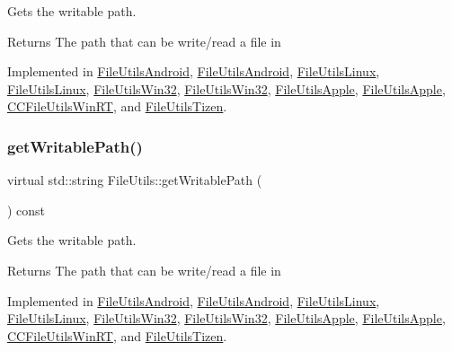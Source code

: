 Gets the writable path. \begin{DoxyReturn}{Returns}
The path that can be write/read a file in 
\end{DoxyReturn}


Implemented in \hyperlink{classFileUtilsAndroid_a98e6cf3fe3d7023fc5adb965c851be85}{File\+Utils\+Android}, \hyperlink{classFileUtilsAndroid_a51cf37a9916441127b8bb349ab037f23}{File\+Utils\+Android}, \hyperlink{classFileUtilsLinux_a8d7c6a6b1d749016cf44849f4842407b}{File\+Utils\+Linux}, \hyperlink{classFileUtilsLinux_a67c863ea1f03b866be4d8be53d4103a1}{File\+Utils\+Linux}, \hyperlink{classFileUtilsWin32_a7aabbee0edc6ccbb7930de5c23383c54}{File\+Utils\+Win32}, \hyperlink{classFileUtilsWin32_a5e9b4cf8f8caa5db5b58606bf8d099b8}{File\+Utils\+Win32}, \hyperlink{classFileUtilsApple_a595858371ceb723ab608f535f8a2c454}{File\+Utils\+Apple}, \hyperlink{classFileUtilsApple_ab88aca64f02b23087542ed28f1ad43d8}{File\+Utils\+Apple}, \hyperlink{classCCFileUtilsWinRT_a546c4b1920e4484929a0d3cffe554720}{C\+C\+File\+Utils\+Win\+RT}, and \hyperlink{classFileUtilsTizen_a5ded2b60f350ec2b245c97ec48e57ffc}{File\+Utils\+Tizen}.

\mbox{\label{classFileUtils_aab14c8d4e292f7a1e9b2b2908d02a0ed}} 
\subsubsection{\texorpdfstring{get\+Writable\+Path()}{getWritablePath()}\hspace{0.1cm}{\footnotesize\ttfamily [2/2]}}
{\footnotesize\ttfamily virtual std\+::string File\+Utils\+::get\+Writable\+Path (\begin{DoxyParamCaption}{ }\end{DoxyParamCaption}) const\hspace{0.3cm}{\ttfamily [pure virtual]}}

Gets the writable path. \begin{DoxyReturn}{Returns}
The path that can be write/read a file in 
\end{DoxyReturn}


Implemented in \hyperlink{classFileUtilsAndroid_a98e6cf3fe3d7023fc5adb965c851be85}{File\+Utils\+Android}, \hyperlink{classFileUtilsAndroid_a51cf37a9916441127b8bb349ab037f23}{File\+Utils\+Android}, \hyperlink{classFileUtilsLinux_a8d7c6a6b1d749016cf44849f4842407b}{File\+Utils\+Linux}, \hyperlink{classFileUtilsLinux_a67c863ea1f03b866be4d8be53d4103a1}{File\+Utils\+Linux}, \hyperlink{classFileUtilsWin32_a7aabbee0edc6ccbb7930de5c23383c54}{File\+Utils\+Win32}, \hyperlink{classFileUtilsWin32_a5e9b4cf8f8caa5db5b58606bf8d099b8}{File\+Utils\+Win32}, \hyperlink{classFileUtilsApple_a595858371ceb723ab608f535f8a2c454}{File\+Utils\+Apple}, \hyperlink{classFileUtilsApple_ab88aca64f02b23087542ed28f1ad43d8}{File\+Utils\+Apple}, \hyperlink{classCCFileUtilsWinRT_a546c4b1920e4484929a0d3cffe554720}{C\+C\+File\+Utils\+Win\+RT}, and \hyperlink{classFileUtilsTizen_a5ded2b60f350ec2b245c97ec48e57ffc}{File\+Utils\+Tizen}.

